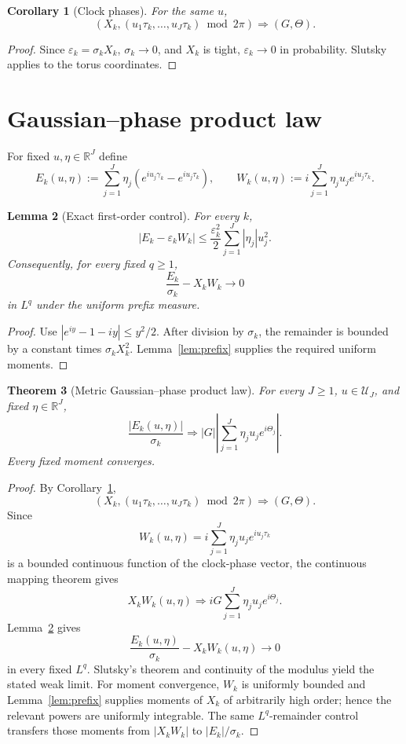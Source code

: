 \documentclass[pdflatex,sn-mathphys-num]{sn-jnl}
\numberwithin{equation}{section}
\theoremstyle{thmstyleone}
\newtheorem{theorem}{Theorem}[section]
\newtheorem{lemma}[theorem]{Lemma}
\newtheorem{corollary}[theorem]{Corollary}
\theoremstyle{thmstylethree}
\theoremstyle{thmstyletwo}
\newcommand{\R}{\mathbb R}
\newcommand{\1}{\mathbf 1}
\begin{document}
\begin{corollary}[Clock phases]
\label{cor:clockphases}
For the same $u$,
\[
 \left(
 X_k,
 (u_1\tau_k,\ldots,u_J\tau_k)\bmod2\pi
 \right)\Longrightarrow(G,\Theta).
\]
\end{corollary}

\begin{proof}
Since $\varepsilon_k=\sigma_kX_k$, $\sigma_k\to0$, and $X_k$ is tight, $\varepsilon_k\to0$ in probability.  Slutsky applies to the torus coordinates.
\end{proof}

\section{Gaussian--phase product law}

For fixed $u,\eta\in\R^J$ define
\[
 E_k(u,\eta):=\sum_{j=1}^J\eta_j
 \left(e^{iu_j\gamma_k}-e^{iu_j\tau_k}\right),
 \qquad
 W_k(u,\eta):=
 i\sum_{j=1}^J\eta_j u_j e^{iu_j\tau_k}.
\]

\begin{lemma}[Exact first-order control]
\label{lem:first_order_control}
For every $k$,
\[
 |E_k-\varepsilon_kW_k|
 \le \frac{\varepsilon_k^2}{2}
 \sum_{j=1}^J|\eta_j|u_j^2.
\]
Consequently, for every fixed $q\ge1$,
\[
 \frac{E_k}{\sigma_k}-X_kW_k\longrightarrow0
\]
in $L^q$ under the uniform prefix measure.
\end{lemma}

\begin{proof}
Use $|e^{iy}-1-iy|\le y^2/2$.  After division by $\sigma_k$, the remainder is bounded by a constant times $\sigma_kX_k^2$.  Lemma~\ref{lem:prefix} supplies the required uniform moments.
\end{proof}

\begin{theorem}[Metric Gaussian--phase product law]
\label{thm:gaussian_phase_product}
For every $J\ge1$, $u\in\mathcal U_J$, and fixed $\eta\in\R^J$,
\[
 \frac{|E_k(u,\eta)|}{\sigma_k}
 \Longrightarrow
 |G|
 \left|
 \sum_{j=1}^J\eta_ju_je^{i\Theta_j}
 \right|.
\]
Every fixed moment converges.
\end{theorem}

\begin{proof}
By Corollary~\ref{cor:clockphases},
\[
 \left(X_k,(u_1\tau_k,\ldots,u_J\tau_k)\bmod2\pi\right)
 \Longrightarrow (G,\Theta).
\]
Since
\[
 W_k(u,\eta)=i\sum_{j=1}^J\eta_ju_je^{iu_j\tau_k}
\]
is a bounded continuous function of the clock-phase vector, the continuous
mapping theorem gives
\[
 X_kW_k(u,\eta)
 \Longrightarrow
 iG\sum_{j=1}^J\eta_ju_je^{i\Theta_j}.
\]
Lemma~\ref{lem:first_order_control} gives
\[
 \frac{E_k(u,\eta)}{\sigma_k}-X_kW_k(u,\eta)\longrightarrow0
\]
in every fixed \(L^q\).  Slutsky's theorem and continuity of the modulus yield
the stated weak limit.  For moment convergence, \(W_k\) is uniformly bounded
and Lemma~\ref{lem:prefix} supplies moments of \(X_k\) of arbitrarily high
order; hence the relevant powers are uniformly integrable.  The same
\(L^q\)-remainder control transfers those moments from \(|X_kW_k|\) to
\(|E_k|/\sigma_k\).
\end{proof}
\end{document}
